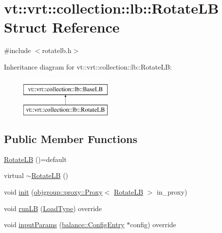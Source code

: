 \hypertarget{structvt_1_1vrt_1_1collection_1_1lb_1_1_rotate_l_b}{}\section{vt\+:\+:vrt\+:\+:collection\+:\+:lb\+:\+:Rotate\+LB Struct Reference}
\label{structvt_1_1vrt_1_1collection_1_1lb_1_1_rotate_l_b}


{\ttfamily \#include $<$rotatelb.\+h$>$}

Inheritance diagram for vt\+:\+:vrt\+:\+:collection\+:\+:lb\+:\+:Rotate\+LB\+:\begin{figure}[H]
\begin{center}
\leavevmode
\includegraphics[height=2.000000cm]{structvt_1_1vrt_1_1collection_1_1lb_1_1_rotate_l_b}
\end{center}
\end{figure}
\subsection*{Public Member Functions}
\begin{DoxyCompactItemize}
\item 
\hyperlink{structvt_1_1vrt_1_1collection_1_1lb_1_1_rotate_l_b_a9cb675c68ec8794d6a2e284ece5de8a8}{Rotate\+LB} ()=default
\item 
virtual \hyperlink{structvt_1_1vrt_1_1collection_1_1lb_1_1_rotate_l_b_ae2a8e40cf47a9ea3be9d4ec6f44d9f50}{$\sim$\+Rotate\+LB} ()
\item 
void \hyperlink{structvt_1_1vrt_1_1collection_1_1lb_1_1_rotate_l_b_a2f0126b5029e1348b86089470ffcd4f2}{init} (\hyperlink{structvt_1_1objgroup_1_1proxy_1_1_proxy}{objgroup\+::proxy\+::\+Proxy}$<$ \hyperlink{structvt_1_1vrt_1_1collection_1_1lb_1_1_rotate_l_b}{Rotate\+LB} $>$ in\+\_\+proxy)
\item 
void \hyperlink{structvt_1_1vrt_1_1collection_1_1lb_1_1_rotate_l_b_a3266fa43e0459b57466d9e184aeae2f7}{run\+LB} (\hyperlink{namespacevt_a8fb51741340b87d7aaee0bef60e9896b}{Load\+Type}) override
\item 
void \hyperlink{structvt_1_1vrt_1_1collection_1_1lb_1_1_rotate_l_b_a39b5c8882b32f8a50be30cf2f3fd8fab}{input\+Params} (\hyperlink{structvt_1_1vrt_1_1collection_1_1balance_1_1_config_entry}{balance\+::\+Config\+Entry} $\ast$config) override
\end{DoxyCompactItemize}
